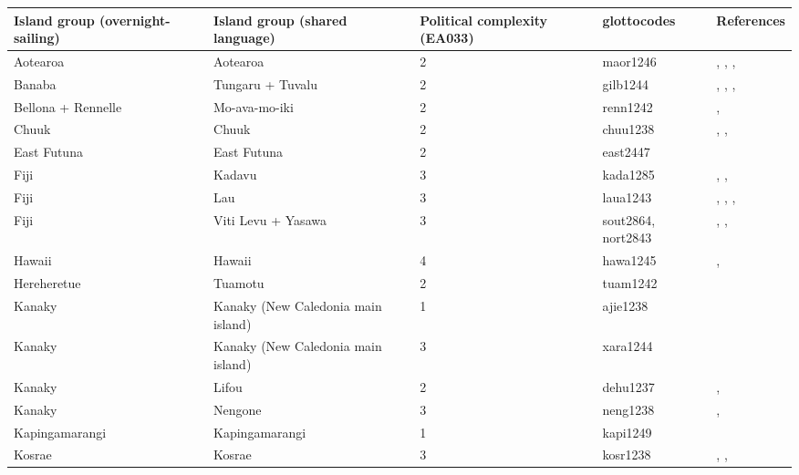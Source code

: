 \begin{longtable}{p{4.5cm}p{2cm}p{2cm}p{2cm}p{4cm}}
  \toprule
Island group (overnight-sailing) & Island group (shared language) & Political complexity (EA033) & glottocodes & References \\ 
  \midrule
Aotearoa & Aotearoa & 2 & maor1246 & \citet{sahlins1958social}, \citet{buck1952}, \citet{kirch1984evolution}, \citet{van1995maori} \\ 
  Banaba & Tungaru + Tuvalu & 2 & gilb1244 & \citet{lambert1966}, \citet{lambert1975makin}, \citet{lambert1991}, \citet{macdonald1982cinderellas} \\ 
  Bellona + Rennelle & Mo-ava-mo-iki & 2 & renn1242 & \citet{birketsmith1956}, \citet{monberg1991bellona} \\ 
  Chuuk & Chuuk & 2 & chuu1238 & \citet{goodenough1991}, \citet{goodenough2002under}, \citet{mahony1960taro} \\ 
  East Futuna & East Futuna & 2 & east2447 & \citet{kirch1994wet} \\ 
  Fiji & Kadavu & 3 & kada1285 & \citet{kuhlken2002intensive}, \citet{scarr1984fiji}, \citet{walter1978examination} \\ 
  Fiji & Lau & 3 & laua1243 & \citet{hocart_1929}, \citet{quain_1948}, \citet{thompson1940a}, \citet{thompson1940b} \\ 
  Fiji & Viti Levu + Yasawa & 3 & sout2864, nort2843 & \citet{kuhlken2002intensive}, \citet{scarr1984fiji}, \citet{walter1978examination} \\ 
  Hawaii & Hawaii & 4 & hawa1245 & \citet{kirch1994wet}, \citet{kirch2010chiefs} \\ 
  Hereheretue & Tuamotu & 2 & tuam1242 & \citet{emory1975material} \\ 
  Kanaky & Kanaky (New Caledonia main island) & 1 & ajie1238 & \citet{winslow1991} \\ 
  Kanaky & Kanaky (New Caledonia main island) & 3 & xara1244 & \citet{young1991goodenough} \\ 
  Kanaky & Lifou & 2 & dehu1237 & \citet{hadfield_1920}, \citet{ray1917people} \\ 
  Kanaky & Nengone & 3 & neng1238 & \citet{dubois1984gens}, \citet{guiart1952organisation} \\ 
  Kapingamarangi & Kapingamarangi & 1 & kapi1249 & \citet{buck1950} \\ 
  Kosrae & Kosrae & 3 & kosr1238 & \citet{athens2007prehistoric}, \citet{graves1986late}, \citet{peoples1991} \\ 

\end{longtable}
